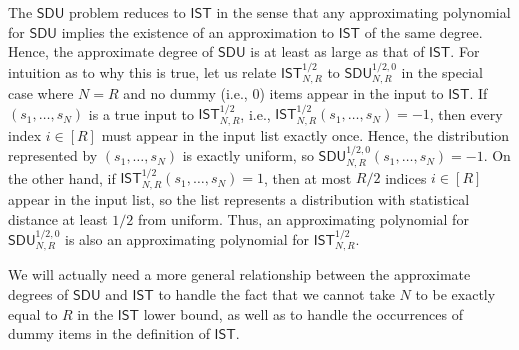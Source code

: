 \documentclass[11pt, letterpaper, fleqn]{article}
\theoremstyle{plain}
\newcommand{\SDU}{\mathsf{ SDU}}
\newcommand{\SE}{\mathsf{ IST}}
\begin{document}
The $\SDU$ problem reduces to $\SE$ in the sense that any approximating polynomial for $\SDU$ implies the existence of an approximation to $\SE$ of the same degree. Hence, the approximate degree of $\SDU$ is at least as large as that of $\SE$. For intuition as to why this is true, let us relate $\SE^{1/2}_{N, R}$ to $\SDU^{1/2, 0}_{N, R}$ in the special case where $N = R$ and no dummy (i.e., 0) items appear in the input to $\SE$. If $(s_1, \dots, s_N)$ is a true input to $\SE^{1/2}_{N, R}$, i.e., $\SE^{1/2}_{N, R}(s_1, \dots, s_N) = -1$, then every index $i \in [R]$ must appear in the input list exactly once. Hence, the distribution represented by $(s_1, \dots, s_N)$ is exactly uniform, so $\SDU^{1/2, 0}_{N, R}(s_1, \dots, s_N) = -1$. On the other hand, if $\SE^{1/2}_{N, R}(s_1, \dots, s_N) = 1$, then at most $R/2$ indices $i \in [R]$ appear in the input list, so the list represents a distribution with statistical distance at least $1/2$ from uniform. Thus, an approximating polynomial for $\SDU^{1/2, 0}_{N, R}$ is also an approximating polynomial for $\SE^{1/2}_{N, R}$.

We will actually need a more general relationship between the approximate degrees of $\SDU$ and $\SE$ to handle the fact that we cannot take $N$ to be exactly equal to $R$ in the $\SE$ lower bound, as well as to handle the occurrences of dummy items in the definition of $\SE$.
\end{document}
